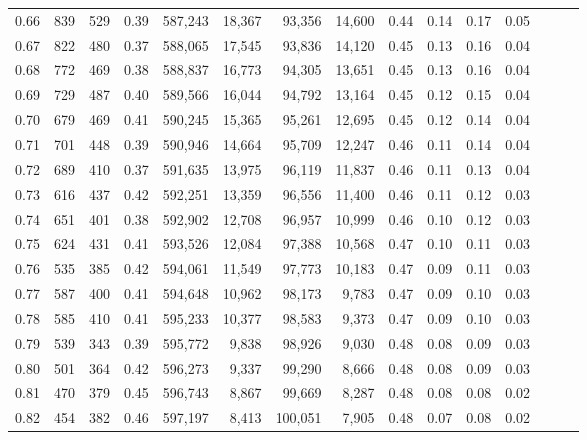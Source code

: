 \begin{tabular}{rrrrrrrrrrrrrrr}
0.66 &     839 &    529 &  0.39 &  587,243 &   18,367 &   93,356 &   14,600 &  0.44 &  0.14 &  0.17 &      0.05 \\
0.67 &     822 &    480 &  0.37 &  588,065 &   17,545 &   93,836 &   14,120 &  0.45 &  0.13 &  0.16 &      0.04 \\
0.68 &     772 &    469 &  0.38 &  588,837 &   16,773 &   94,305 &   13,651 &  0.45 &  0.13 &  0.16 &      0.04 \\
0.69 &     729 &    487 &  0.40 &  589,566 &   16,044 &   94,792 &   13,164 &  0.45 &  0.12 &  0.15 &      0.04 \\
0.70 &     679 &    469 &  0.41 &  590,245 &   15,365 &   95,261 &   12,695 &  0.45 &  0.12 &  0.14 &      0.04 \\
0.71 &     701 &    448 &  0.39 &  590,946 &   14,664 &   95,709 &   12,247 &  0.46 &  0.11 &  0.14 &      0.04 \\
0.72 &     689 &    410 &  0.37 &  591,635 &   13,975 &   96,119 &   11,837 &  0.46 &  0.11 &  0.13 &      0.04 \\
0.73 &     616 &    437 &  0.42 &  592,251 &   13,359 &   96,556 &   11,400 &  0.46 &  0.11 &  0.12 &      0.03 \\
0.74 &     651 &    401 &  0.38 &  592,902 &   12,708 &   96,957 &   10,999 &  0.46 &  0.10 &  0.12 &      0.03 \\
0.75 &     624 &    431 &  0.41 &  593,526 &   12,084 &   97,388 &   10,568 &  0.47 &  0.10 &  0.11 &      0.03 \\
0.76 &     535 &    385 &  0.42 &  594,061 &   11,549 &   97,773 &   10,183 &  0.47 &  0.09 &  0.11 &      0.03 \\
0.77 &     587 &    400 &  0.41 &  594,648 &   10,962 &   98,173 &    9,783 &  0.47 &  0.09 &  0.10 &      0.03 \\
0.78 &     585 &    410 &  0.41 &  595,233 &   10,377 &   98,583 &    9,373 &  0.47 &  0.09 &  0.10 &      0.03 \\
0.79 &     539 &    343 &  0.39 &  595,772 &    9,838 &   98,926 &    9,030 &  0.48 &  0.08 &  0.09 &      0.03 \\
0.80 &     501 &    364 &  0.42 &  596,273 &    9,337 &   99,290 &    8,666 &  0.48 &  0.08 &  0.09 &      0.03 \\
0.81 &     470 &    379 &  0.45 &  596,743 &    8,867 &   99,669 &    8,287 &  0.48 &  0.08 &  0.08 &      0.02 \\
0.82 &     454 &    382 &  0.46 &  597,197 &    8,413 &  100,051 &    7,905 &  0.48 &  0.07 &  0.08 &      0.02 \\

\end{tabular}
